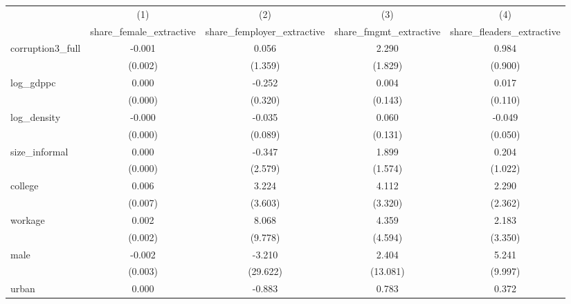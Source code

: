 {
\def\sym#1{\ifmmode^{#1}\else\(^{#1}\)\fi}
\begin{tabular}{l*{4}{c}}
\hline\hline
            &\multicolumn{1}{c}{(1)}&\multicolumn{1}{c}{(2)}&\multicolumn{1}{c}{(3)}&\multicolumn{1}{c}{(4)}\\
            &\multicolumn{1}{c}{share\_female\_extractive}&\multicolumn{1}{c}{share\_femployer\_extractive}&\multicolumn{1}{c}{share\_fmgmt\_extractive}&\multicolumn{1}{c}{share\_fleaders\_extractive}\\
\hline
corruption3\_full&      -0.001         &       0.056         &       2.290         &       0.984         \\
            &     (0.002)         &     (1.359)         &     (1.829)         &     (0.900)         \\
[1em]
log\_gdppc   &       0.000         &      -0.252         &       0.004         &       0.017         \\
            &     (0.000)         &     (0.320)         &     (0.143)         &     (0.110)         \\
[1em]
log\_density &      -0.000         &      -0.035         &       0.060         &      -0.049         \\
            &     (0.000)         &     (0.089)         &     (0.131)         &     (0.050)         \\
[1em]
size\_informal&       0.000         &      -0.347         &       1.899         &       0.204         \\
            &     (0.000)         &     (2.579)         &     (1.574)         &     (1.022)         \\
[1em]
college     &       0.006         &       3.224         &       4.112         &       2.290         \\
            &     (0.007)         &     (3.603)         &     (3.320)         &     (2.362)         \\
[1em]
workage     &       0.002         &       8.068         &       4.359         &       2.183         \\
            &     (0.002)         &     (9.778)         &     (4.594)         &     (3.350)         \\
[1em]
male        &      -0.002         &      -3.210         &       2.404         &       5.241         \\
            &     (0.003)         &    (29.622)         &    (13.081)         &     (9.997)         \\
[1em]
urban       &       0.000         &      -0.883         &       0.783         &       0.372         \\

\end{tabular}}
